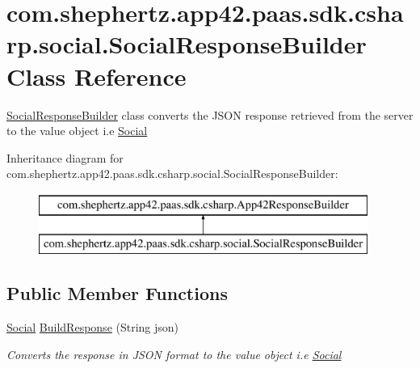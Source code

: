 \hypertarget{classcom_1_1shephertz_1_1app42_1_1paas_1_1sdk_1_1csharp_1_1social_1_1_social_response_builder}{\section{com.\+shephertz.\+app42.\+paas.\+sdk.\+csharp.\+social.\+Social\+Response\+Builder Class Reference}
\label{classcom_1_1shephertz_1_1app42_1_1paas_1_1sdk_1_1csharp_1_1social_1_1_social_response_builder}
}


\hyperlink{classcom_1_1shephertz_1_1app42_1_1paas_1_1sdk_1_1csharp_1_1social_1_1_social_response_builder}{Social\+Response\+Builder} class converts the J\+S\+O\+N response retrieved from the server to the value object i.\+e \hyperlink{classcom_1_1shephertz_1_1app42_1_1paas_1_1sdk_1_1csharp_1_1social_1_1_social}{Social}  


Inheritance diagram for com.\+shephertz.\+app42.\+paas.\+sdk.\+csharp.\+social.\+Social\+Response\+Builder\+:\begin{figure}[H]
\begin{center}
\leavevmode
\includegraphics[height=2.000000cm]{classcom_1_1shephertz_1_1app42_1_1paas_1_1sdk_1_1csharp_1_1social_1_1_social_response_builder}
\end{center}
\end{figure}
\subsection*{Public Member Functions}
\begin{DoxyCompactItemize}
\item 
\hyperlink{classcom_1_1shephertz_1_1app42_1_1paas_1_1sdk_1_1csharp_1_1social_1_1_social}{Social} \hyperlink{classcom_1_1shephertz_1_1app42_1_1paas_1_1sdk_1_1csharp_1_1social_1_1_social_response_builder_a76f4707fe9ae403cedf4f5ad67a862b3}{Build\+Response} (String json)
\begin{DoxyCompactList}\small\item\em Converts the response in J\+S\+O\+N format to the value object i.\+e \hyperlink{classcom_1_1shephertz_1_1app42_1_1paas_1_1sdk_1_1csharp_1_1social_1_1_social}{Social} \end{DoxyCompactList}\end{DoxyCompactItemize}


